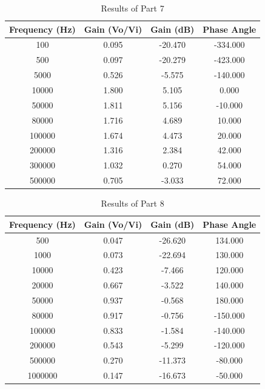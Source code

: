 \documentclass[CMPE]{KGCOEReport}
\begin{document}
\begin{table}[H]
    \centering
    \caption{Results of Part 7}
    \begin{tabular}{|c|c|c|c|}
        \hline
        Frequency (Hz) & Gain (Vo/Vi) & Gain (dB) & Phase Angle \\
        \hline
        100 & 0.095 & -20.470 & -334.000 \\
        500 & 0.097 & -20.279 & -423.000 \\
        5000 & 0.526 & -5.575 & -140.000 \\
        10000 & 1.800 & 5.105 & 0.000 \\
        50000 & 1.811 & 5.156 & -10.000 \\
        80000 & 1.716 & 4.689 & 10.000 \\
        100000 & 1.674 & 4.473 & 20.000 \\
        200000 & 1.316 & 2.384 & 42.000 \\
        300000 & 1.032 & 0.270 & 54.000 \\
        500000 & 0.705 & -3.033 & 72.000 \\
        \hline
    \end{tabular}
\end{table}

\begin{table}[H]
    \centering
    \caption{Results of Part 8}
    \begin{tabular}{|c|c|c|c|}
        \hline
        Frequency (Hz) & Gain (Vo/Vi) & Gain (dB) & Phase Angle \\
        \hline
        500 & 0.047 & -26.620 & 134.000 \\
        1000 & 0.073 & -22.694 & 130.000 \\
        10000 & 0.423 & -7.466 & 120.000 \\
        20000 & 0.667 & -3.522 & 140.000 \\
        50000 & 0.937 & -0.568 & 180.000 \\
        80000 & 0.917 & -0.756 & -150.000 \\
        100000 & 0.833 & -1.584 & -140.000 \\
        200000 & 0.543 & -5.299 & -120.000 \\
        500000 & 0.270 & -11.373 & -80.000 \\
        1000000 & 0.147 & -16.673 & -50.000 \\
        \hline
    \end{tabular}
\end{table}
\end{document}
